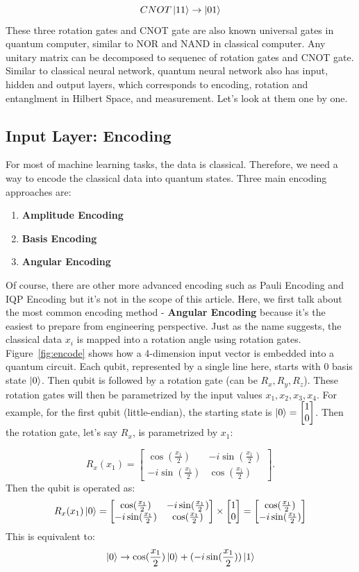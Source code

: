\documentclass[12pt]{article}
\numberwithin{equation}{section}  %
\theoremstyle{definition}
\theoremstyle{plain}
\theoremstyle{remark}
\begin{document}
\[CNOT\ket{11}\rightarrow\ket{01}\]
These three rotation gates and CNOT gate are also known universal gates in quantum computer, similar to NOR and NAND in classical computer. Any unitary matrix can be decomposed to sequenec of rotation gates and CNOT gate. Similar to classical neural network, quantum neural network also has input, hidden and output layers, which corresponds to encoding, rotation and entanglment in Hilbert Space, and measurement. Let's look at them one by one.

\subsection{Input Layer: Encoding}
For most of machine learning tasks, the data is classical. Therefore, we need a way to encode the classical data into quantum states. Three main encoding approaches are:
\begin{enumerate}
    \item \textbf{Amplitude Encoding}
    \item \textbf{Basis Encoding}
    \item \textbf{Angular Encoding}
\end{enumerate}
Of course, there are other more advanced encoding such as Pauli Encoding and IQP Encoding but it's not in the scope of this article. Here, we first talk about the most common encoding method - \textbf{Angular Encoding} because it's the easiest to prepare from engineering perspective. Just as the name suggests, the classical data $x_i$ is mapped into a rotation angle using rotation gates. Figure~\ref{fig:encode} shows how a 4-dimension input vector is embedded into a quantum circuit. Each qubit, represented by a single line here, starts with 0 basis state $\ket{0}$. Then qubit is followed by a rotation gate (can be $R_x,R_y,R_z$). These rotation gates will then be parametrized by the input values $x_1,x_2,x_3,x_4$. For example, for the first qubit (little-endian), the starting state is $\ket{0}=\begin{bmatrix}1\\0\end{bmatrix}$. Then the rotation gate, let's say $R_x$, is parametrized by $x_1$:

\[R_x(x_1)=\begin{bmatrix}
    \cos(\frac{x_1}{2})&-i\sin(\frac{x_1}{2})\\-i\sin(\frac{x_1}{2})&\cos(\frac{x_1}{2})
\end{bmatrix}.\]
Then the qubit is operated as:
\[R_x(x_1)\ket{0}=
    \begin{bmatrix}
    \cos(\frac{x_1}{2})&-i\sin(\frac{x_1}{2})\\-i\sin(\frac{x_1}{2})&\cos(\frac{x_1}{2})\end{bmatrix}\times \begin{bmatrix}1\\0\end{bmatrix}=\begin{bmatrix}
    \cos(\frac{x_1}{2})\\-i\sin(\frac{x_1}{2})
    \end{bmatrix}\]
This is equivalent to:
\[\ket{0}\rightarrow \cos(\frac{x_1}{2})\ket{0}+(-i\sin(\frac{x_1}{2}))\ket{1}\]
\end{document}

